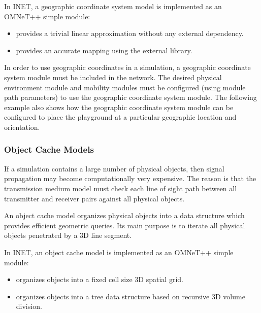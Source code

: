 In INET, a geographic coordinate system model is implemented as an OMNeT++
simple module:

\begin{itemize}
        \item {} provides a trivial linear approximation without any external dependency.
        \item {} provides an accurate mapping using the external  library.
\end{itemize}

In order to use geographic coordinates in a simulation, a geographic
coordinate system module must be included in the network. The desired
physical environment module and mobility modules must be configured (using
module path parameters) to use the geographic coordinate system module. The
following example also shows how the geographic coordinate system module
can be configured to place the playground at a particular geographic
location and orientation.


\subsubsection*{Object Cache Models}

If a simulation contains a large number of physical objects, then signal
propagation may become computationally very expensive. The reason is that
the transmission medium model must check each line of sight path between
all transmitter and receiver pairs against all physical objects.

An object cache model organizes physical objects into a data structure
which provides efficient geometric queries. Its main purpose is to iterate
all physical objects penetrated by a 3D line segment.

In INET, an object cache model is implemented as an OMNeT++ simple module:

\begin{itemize}
        \item {} organizes objects into a fixed cell size 3D spatial grid.
        \item {} organizes objects into a tree data structure based on recursive 3D volume division.
\end{itemize}



